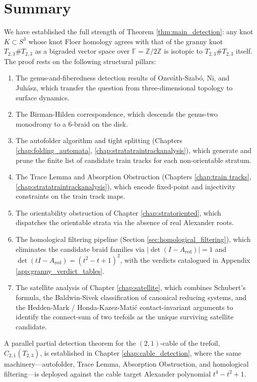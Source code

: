 \section{Summary}

We have established the full strength of Theorem \ref{thm:main_detection}: any knot $K \subset S^3$ whose knot Floer homology agrees with that of the granny knot $T_{2,3}\# T_{2,3}$ as a bigraded vector space over $\mathbb{F} = \mathbb{Z}/2\mathbb{Z}$ is isotopic to $T_{2,3}\# T_{2,3}$ itself. The proof rests on the following structural pillars:

\begin{enumerate}
    \item The genus-and-fiberedness detection results of Ozsv\'{a}th-Szab\'{o}, Ni, and Juh\'{a}sz, which transfer the question from three-dimensional topology to surface dynamics.
    \item The Birman-Hilden correspondence, which descends the genus-two monodromy to a 6-braid on the disk.
    \item The autofolder algorithm and tight splitting (Chapters \ref{chap:folding_automata}, \ref{chap:stratatraintrackanalysis}), which generate and prune the finite list of candidate train tracks for each non-orientable stratum.
    \item The Trace Lemma and Absorption Obstruction (Chapters \ref{chap:train tracks}, \ref{chap:stratatraintrackanalysis}), which encode fixed-point and injectivity constraints on the train track maps.
    \item The orientability obstruction of Chapter \ref{chap:stratoriented}, which dispatches the orientable strata via the absence of real Alexander roots.
    \item The homological filtering pipeline (Section \ref{sec:homological_filtering}), which eliminates the candidate braid families via $|\det(I - A_{\text{red}})| = 1$ and $\det(tI - A_{\text{red}}) = (t^2-t+1)^2$, with the verdicts catalogued in Appendix \ref{app:granny_verdict_tables}.
    \item The satellite analysis of Chapter \ref{chap:satellite}, which combines Schubert's formula, the Baldwin-Sivek classification of canonical reducing systems, and the Hedden-Mark / Honda-Kazez-Mati\'{c} contact-invariant arguments to identify the connect-sum of two trefoils as the unique surviving satellite candidate.
\end{enumerate}

A parallel partial detection theorem for the $(2,1)$-cable of the trefoil, $C_{2,1}(T_{2,3})$, is established in Chapter \ref{chap:cable_detection}, where the same machinery---autofolder, Trace Lemma, Absorption Obstruction, and homological filtering---is deployed against the cable target Alexander polynomial $t^4 - t^2 + 1$.